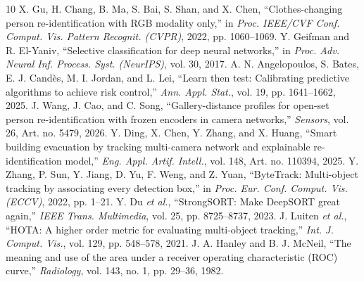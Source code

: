 \documentclass[journal]{IEEEtran}
\begin{document}
\begin{thebibliography}{10}
 X. Gu, H. Chang, B. Ma, S. Bai, S. Shan, and X. Chen, ``Clothes-changing person re-identification with RGB modality only,'' in \emph{Proc. IEEE/CVF Conf. Comput. Vis. Pattern Recognit. (CVPR)}, 2022, pp. 1060--1069.
 Y. Geifman and R. El-Yaniv, ``Selective classification for deep neural networks,'' in \emph{Proc. Adv. Neural Inf. Process. Syst. (NeurIPS)}, vol. 30, 2017.
 A. N. Angelopoulos, S. Bates, E. J. Cand\`es, M. I. Jordan, and L. Lei, ``Learn then test: Calibrating predictive algorithms to achieve risk control,'' \emph{Ann. Appl. Stat.}, vol. 19, pp. 1641--1662, 2025.
 J. Wang, J. Cao, and C. Song, ``Gallery-distance profiles for open-set person re-identification with frozen encoders in camera networks,'' \emph{Sensors}, vol. 26, Art. no. 5479, 2026.
 Y. Ding, X. Chen, Y. Zhang, and X. Huang, ``Smart building evacuation by tracking multi-camera network and explainable re-identification model,'' \emph{Eng. Appl. Artif. Intell.}, vol. 148, Art. no. 110394, 2025.
 Y. Zhang, P. Sun, Y. Jiang, D. Yu, F. Weng, and Z. Yuan, ``ByteTrack: Multi-object tracking by associating every detection box,'' in \emph{Proc. Eur. Conf. Comput. Vis. (ECCV)}, 2022, pp. 1--21.
 Y. Du \emph{et al.}, ``StrongSORT: Make DeepSORT great again,'' \emph{IEEE Trans. Multimedia}, vol. 25, pp. 8725--8737, 2023.
 J. Luiten \emph{et al.}, ``HOTA: A higher order metric for evaluating multi-object tracking,'' \emph{Int. J. Comput. Vis.}, vol. 129, pp. 548--578, 2021.
 J. A. Hanley and B. J. McNeil, ``The meaning and use of the area under a receiver operating characteristic (ROC) curve,'' \emph{Radiology}, vol. 143, no. 1, pp. 29--36, 1982.
\end{thebibliography}
\end{document}
